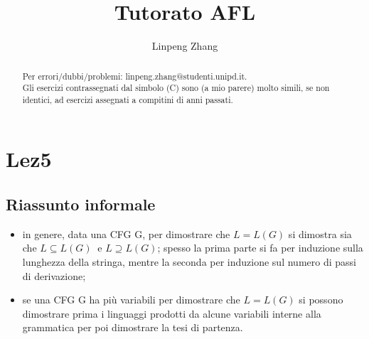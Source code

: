 \documentclass[a4paper,11pt]{article}
\begin{document}
\author{Linpeng Zhang}
\title{Tutorato AFL}
\maketitle
\begin{abstract}
    Per errori/dubbi/problemi: linpeng.zhang@studenti.unipd.it.%
    \\Gli esercizi contrassegnati dal simbolo (C) sono (a mio parere) molto simili, se non identici, ad esercizi assegnati a compitini di anni passati.
\end{abstract}
\tableofcontents
\section{Lez5}
\subsection{Riassunto informale}
\begin{itemize}
    \item in genere, data una CFG G, per dimostrare che $L=L(G)$ si dimostra sia che $L\subseteq L(G) \:$ e $L\supseteq L(G)$; spesso la prima parte si fa per induzione sulla lunghezza della stringa, mentre la seconda per induzione sul numero di passi di derivazione;
    \item se una CFG G ha più variabili per dimostrare che $L=L(G)$ si possono dimostrare prima i linguaggi prodotti da alcune variabili interne alla grammatica per poi dimostrare la tesi di partenza.
\end{itemize}
\end{document}
